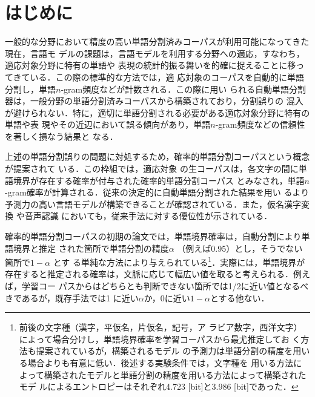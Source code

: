 \documentclass[japanese]{jnlp_1.4}
\begin{document}
\maketitle


\section{はじめに}

一般的な分野において精度の高い単語分割済みコーパスが利用可能になってきた現在，言語モ
デルの課題は，言語モデルを利用する分野への適応，すなわち，適応対象分野に特有の単語や
表現の統計的振る舞いを的確に捉えることに移ってきている．この際の標準的な方法では，適
応対象のコーパスを自動的に単語分割し，単語$n$-gram頻度などが計数される．この際に用い
られる自動単語分割器は，一般分野の単語分割済みコーパスから構築されており，分割誤りの
混入が避けられない．特に，適切に単語分割される必要がある適応対象分野に特有の単語や表
現やその近辺において誤る傾向があり，単語$n$-gram頻度などの信頼性を著しく損なう結果と
なる．

上述の単語分割誤りの問題に対処するため，確率的単語分割コーパスという概念が提案されて
いる\cite{確率的単語分割コーパスからの単語N-gram確率の計算}．この枠組では，適応対象
の生コーパスは，各文字の間に単語境界が存在する確率が付与された確率的単語分割コーパス
とみなされ，単語$n$-gram確率が計算される．従来の決定的に自動単語分割された結果を用い
るより予測力の高い言語モデルが構築できることが確認されている．また，仮名漢字変換
\cite{無限語彙の仮名漢字変換}や音声認識
\cite{Unsupervised.Adaptation.Of.A.Stochastic.Language.Model.Using.A.Japanese.Raw.Corpus}
においても，従来手法に対する優位性が示されている．

確率的単語分割コーパスの初期の論文では，単語境界確率は，自動分割により単語境界と推定
された箇所で単語分割の精度$\alpha$ （例えば0.95）とし，そうでない箇所で$1-\alpha$ とす
る単純な方法により与えられている\footnote{前後の文字種（漢字，平仮名，片仮名，記号，ア
ラビア数字，西洋文字）によって場合分けし，単語境界確率を学習コーパスから最尤推定してお
く方法\cite{生コーパスからの単語N-gram確率の推定}も提案されているが，構築されるモデル
の予測力は単語分割の精度を用いる場合よりも有意に低い．後述する実験条件では，文字種を
用いる方法によって構築されたモデルと単語分割の精度を用いる方法によって構築されたモデ
ルによるエントロピーはそれぞれ4.723 [bit]と3.986 [bit]であった．}．実際には，単語境界が
存在すると推定される確率は，文脈に応じて幅広い値を取ると考えられる．例えば，学習コー
パスからはどちらとも判断できない箇所では1/2に近い値となるべきであるが，既存手法では1
に近い$\alpha$か，0に近い$1-\alpha$とする他ない．
\end{document}
